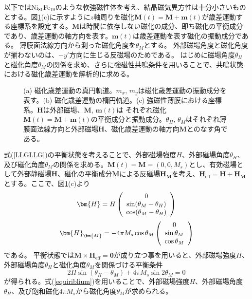 以下ではNi$_{81}$Fe$_{19}$のような軟強磁性体を考え、結晶磁気異方性は十分小さいものとする。図\ref{coordinate}(c)に示すように$z$軸周りを磁化$\bm{M}(t)=\bm{M}+\bm{m}(t)$が歳差運動する座標系を設定する。$\bm{M}$は時間に依存しない磁化の成分、即ち磁化の平衡成分であり、歳差運動の軸方向を表す。$\bm{m}(t)$は歳差運動を表す磁化の振動成分である。
薄膜面法線方向から測った磁化角度を$\theta_M$とする。
外部磁場角度と磁化角度が揃わないのは、$-y'$方向に生じる反磁場のためである。
はじめに磁場角度$\theta_H$と磁化角度$\theta_M$の関係を求め、さらに強磁性共鳴条件を用いることで、共鳴状態における磁化歳差運動を解析的に求める。

\begin{figure}[tbp]
\begin{center}
\caption{(a) 磁化歳差運動の真円軌道。$m_x$, $m_y$は磁化歳差運動の振動成分を表す。(b) 磁化歳差運動の楕円軌道。(c) 強磁性薄膜における座標系。$\bm{H}$は外部磁場、$\bm{M}$, $\bm{m}(t)$は
それぞれ磁化$\bm{M}(t)=\bm{M}+\bm{m}(t)$の平衡成分と振動成分。$\theta_H$, $\theta_M$はそれぞれ薄膜面法線方向と外部磁場$\bm{H}$、磁化歳差運動の軸方向$\bm{M}$とのなす角である。}
\label{coordinate}
\end{center}
\end{figure}


式(\ref{LLGLLG})の平衡状態を考えることで、外部磁場強度$H$、外部磁場角度$\theta_H$、及び磁化角度$\theta_M$の関係を求める。$\bm{M}(t)=\bm{M}=(0, 0, M_s)$とし、有効磁場として外部静磁場$\bm{H}$、磁化の平衡成分$\bm{M}$による反磁場$\bm{H}_{\bm{M}}$を考え、$\bm{H}_\text{eff}=\bm{H}+\bm{H}_{\bm{M}}$とする。ここで、図\ref{coordinate}(c)より
\begin{equation}
 \bm{H} = H\left( {\begin{array}{*{20}c}
   0  \\
   {\sin (  \theta_M -\theta_H )}  \\
   {\cos (\theta_M -\theta_H )}  \\
\end{array}} \right) \label{H1}
\end{equation}
\begin{equation}
 \bm{H}_{\bm{M}}  =  - 4\pi M_s \cos \theta_M \left( {\begin{array}{*{20}c}
   0  \\
   {\sin \theta_M }  \\
   {\cos  \theta_M }  \\
\end{array}} \right) \label{H2}
\end{equation}
である。
平衡状態では$\bm{M}\times\bm{H}_{\text{eff}}=\bm{0}$が成り立つ事を用いると、外部磁場強度$H$、外部磁場角度$\theta_H$と磁化角度$\theta_M$を関係づける平衡条件
\begin{equation}
2H\sin(\theta_H-\theta_M)+4\pi M_s\sin2\theta_M=0    \label{equiriblium}
\end{equation}
が得られる。式(\ref{equiriblium})を用いることで、外部磁場強度$H$、外部磁場角度$\theta_H$、及び飽和磁化$4\pi M_s$から磁化角度$\theta_M$が求められる。



